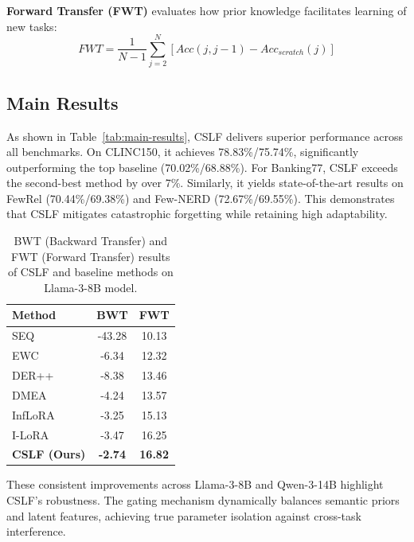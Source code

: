 \documentclass[11pt]{article}
\begin{document}
\textbf{Forward Transfer (FWT)} evaluates how prior knowledge facilitates learning of new tasks:
\begin{equation}
    FWT = \frac{1}{N-1} \sum_{j=2}^{N} \left[ Acc(j, j-1) - Acc_{scratch}(j) \right]
\end{equation}


\subsection{Main Results}
As shown in Table~\ref{tab:main-results}, CSLF delivers superior performance across all benchmarks. On CLINC150, it achieves 78.83\%/75.74\%, significantly outperforming the top baseline (70.02\%/68.88\%). For Banking77, CSLF exceeds the second-best method by over 7\%. Similarly, it yields state-of-the-art results on FewRel (70.44\%/69.38\%) and Few-NERD (72.67\%/69.55\%). This demonstrates that CSLF mitigates catastrophic forgetting while retaining high adaptability. 

\begin{table}[ht]
    
    \centering
    \begin{tabular}{lcc}
        \toprule
        Method & BWT  & FWT  \\
        \midrule
        SEQ & -43.28 & 10.13 \\
        EWC & -6.34 & 12.32 \\
        DER++ & -8.38 & 13.46 \\
        \hdashline
        DMEA & -4.24 & 13.57 \\
        InfLoRA & -3.25 & 15.13 \\
        I-LoRA & -3.47 & 16.25 \\
        \hdashline
        \textbf{CSLF (Ours)} & \textbf{-2.74} & \textbf{16.82} \\
        \bottomrule
        
    \end{tabular}
    \caption{BWT (Backward Transfer) and FWT (Forward Transfer) results of CSLF and baseline methods on Llama-3-8B model.}
    \label{tab:transfer-results}
    
\end{table}



These consistent improvements across Llama-3-8B and Qwen-3-14B highlight CSLF's robustness. The gating mechanism dynamically balances semantic priors and latent features, achieving true parameter isolation against cross-task interference.
\end{document}
